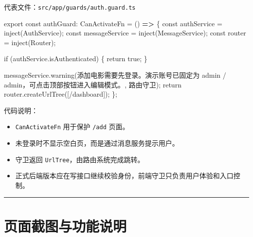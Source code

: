\documentclass[
]{ctexart}
\newenvironment{Shaded}{}{}
\newcommand{\AttributeTok}[1]{\textcolor[rgb]{0.49,0.56,0.16}{#1}}
\newcommand{\FunctionTok}[1]{\textcolor[rgb]{0.02,0.16,0.49}{#1}}
\newcommand{\KeywordTok}[1]{\textcolor[rgb]{0.00,0.44,0.13}{\textbf{#1}}}
\newcommand{\NormalTok}[1]{#1}
\newcommand{\OperatorTok}[1]{\textcolor[rgb]{0.40,0.40,0.40}{#1}}
\newcommand{\StringTok}[1]{\textcolor[rgb]{0.25,0.44,0.63}{#1}}
\providecommand{\tightlist}{%
  \setlength{\itemsep}{0pt}\setlength{\parskip}{0pt}}
\begin{document}
代表文件：\texttt{src/app/guards/auth.guard.ts}

\begin{Shaded}
\begin{Highlighting}[]
\NormalTok{export const authGuard}\OperatorTok{:}\NormalTok{ CanActivateFn }\OperatorTok{=}\NormalTok{ () }\KeywordTok{=\textgreater{}}\NormalTok{ \{}
\NormalTok{  const authService }\OperatorTok{=} \FunctionTok{inject}\NormalTok{(AuthService)}\OperatorTok{;}
\NormalTok{  const messageService }\OperatorTok{=} \FunctionTok{inject}\NormalTok{(MessageService)}\OperatorTok{;}
\NormalTok{  const router }\OperatorTok{=} \FunctionTok{inject}\NormalTok{(Router)}\OperatorTok{;}

  \FunctionTok{if}\NormalTok{ (authService}\OperatorTok{.}\AttributeTok{isAuthenticated}\NormalTok{) \{}
\NormalTok{    return true}\OperatorTok{;}
\NormalTok{  \}}

\NormalTok{  messageService}\OperatorTok{.}\FunctionTok{warning}\NormalTok{(}\StringTok{\textquotesingle{}添加电影需要先登录。演示账号已固定为 admin / admin，可点击顶部按钮进入编辑模式。\textquotesingle{}}\OperatorTok{,} \StringTok{\textquotesingle{}路由守卫\textquotesingle{}}\NormalTok{)}\OperatorTok{;}
\NormalTok{  return router}\OperatorTok{.}\FunctionTok{createUrlTree}\NormalTok{([}\StringTok{\textquotesingle{}/dashboard\textquotesingle{}}\NormalTok{])}\OperatorTok{;}
\NormalTok{\}}\OperatorTok{;}
\end{Highlighting}
\end{Shaded}

代码说明：

\begin{itemize}
\tightlist
\item
  \texttt{CanActivateFn} 用于保护 \texttt{/add} 页面。
\item
  未登录时不显示空白页，而是通过消息服务提示用户。
\item
  守卫返回 \texttt{UrlTree}，由路由系统完成跳转。
\item
  正式后端版本应在写接口继续校验身份，前端守卫只负责用户体验和入口控制。
\end{itemize}

\begin{center}\rule{0.5\linewidth}{0.5pt}\end{center}

\hypertarget{ux9875ux9762ux622aux56feux4e0eux529fux80fdux8bf4ux660e}{%
\section{页面截图与功能说明}\label{ux9875ux9762ux622aux56feux4e0eux529fux80fdux8bf4ux660e}}
\end{document}
